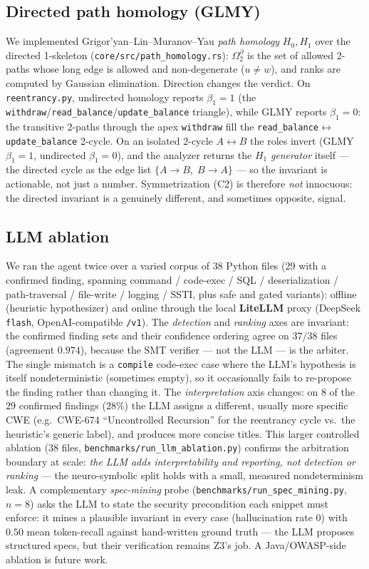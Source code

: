 \documentclass[11pt]{article}
\begin{document}
\subsection{Directed path homology (GLMY)}
We implemented Grigor'yan--Lin--Muranov--Yau \emph{path homology} $H_0,H_1$ over
the directed 1-skeleton (\texttt{core/src/path\_homology.rs}): $\Omega_2^\partial$
is the set of allowed 2-paths whose long edge is allowed and non-degenerate
($u\neq w$), and ranks are computed by Gaussian elimination. Direction changes
the verdict. On \texttt{reentrancy.py}, undirected homology reports $\beta_1=1$
(the \texttt{withdraw}/\texttt{read\_balance}/\texttt{update\_balance} triangle),
while GLMY reports $\beta_1=0$: the transitive 2-paths through the apex
\texttt{withdraw} fill the \texttt{read\_balance}$\leftrightarrow$\texttt{update\_balance}
2-cycle. On an isolated 2-cycle $A\leftrightarrow B$ the roles invert (GLMY
$\beta_1=1$, undirected $\beta_1=0$), and the analyzer returns the $H_1$
\emph{generator} itself --- the directed cycle as the edge list
$\{A\to B,\;B\to A\}$ --- so the invariant is actionable, not just a number.
Symmetrization (C2) is therefore \emph{not}
innocuous: the directed invariant is a genuinely different, and sometimes
opposite, signal.

\subsection{LLM ablation}
We ran the agent twice over a varied corpus of 38 Python files (29 with a
confirmed finding, spanning command / code-exec / SQL / deserialization /
path-traversal / file-write / logging / SSTI, plus safe and gated variants):
offline (heuristic hypothesizer) and online through the local \textbf{LiteLLM}
proxy (DeepSeek \texttt{flash}, OpenAI-compatible \texttt{/v1}). The
\emph{detection} and \emph{ranking} axes are invariant: the confirmed finding
sets and their confidence ordering agree on $37/38$ files (agreement $0.974$),
because the SMT verifier --- not the LLM --- is the arbiter. The single mismatch
is a \texttt{compile} code-exec case where the LLM's hypothesis is itself
nondeterministic (sometimes empty), so it occasionally fails to re-propose the
finding rather than changing it. The \emph{interpretation} axis changes: on $8$
of the $29$ confirmed findings ($28\%$) the LLM assigns a different, usually
more specific CWE (e.g.\ CWE-674 ``Uncontrolled Recursion'' for the reentrancy
cycle vs.\ the heuristic's generic label), and produces more concise titles.
This larger controlled ablation (38 files,
\texttt{benchmarks/run\_llm\_ablation.py}) confirms the arbitration boundary at
scale: \emph{the LLM adds interpretability and reporting, not detection or
ranking} --- the neuro-symbolic split holds with a small, measured nondeterminism
leak. A complementary \emph{spec-mining} probe
(\texttt{benchmarks/run\_spec\_mining.py}, $n=8$) asks the LLM to state the
security precondition each snippet must enforce: it mines a plausible invariant
in every case (hallucination rate $0$) with $0.50$ mean token-recall against
hand-written ground truth --- the LLM proposes structured specs, but their
verification remains Z3's job. A Java/OWASP-side ablation is future work.
\end{document}
